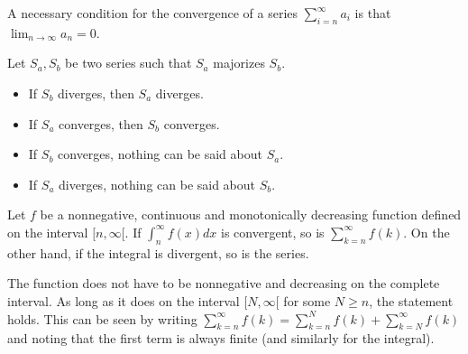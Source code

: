     \begin{property}
        A necessary condition for the convergence of a series $\sum_{i=n}^\infty a_i$ is that $\lim_{n\rightarrow\infty}a_n = 0$.
    \end{property}


    \begin{method}
        Let $S_a,S_b$ be two series such that $S_a$ majorizes $S_b$.
        \begin{itemize}
            \item If $S_b$ diverges, then $S_a$ diverges.
            \item If $S_a$ converges, then $S_b$ converges.
            \item If $S_b$ converges, nothing can be said about $S_a$.
            \item If $S_a$ diverges, nothing can be said about $S_b$.
        \end{itemize}
    \end{method}

    \begin{method}
        Let $f$ be a nonnegative, continuous and monotonically decreasing function defined on the interval $[n,\infty[$. If $\int_n^\infty f(x)dx$ is convergent, so is $\sum_{k=n}^\infty f(k)$. On the other hand, if the integral is divergent, so is the series.
    \end{method}
    \begin{remark}
        The function does not have to be nonnegative and decreasing on the complete interval. As long as it does on the interval $[N,\infty[$ for some $N\geq n$, the statement holds. This can be seen by writing $\sum_{k=n}^\infty f(k) = \sum_{k=n}^Nf(k) + \sum_{k=N}^\infty f(k)$ and noting that the first term is always finite (and similarly for the integral).
    \end{remark}

